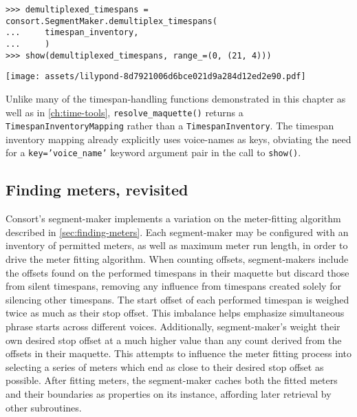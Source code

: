 \begin{abjadbookoutput}
\begin{singlespacing}
\vspace{-0.5\baselineskip}
\begin{lstlisting}
>>> demultiplexed_timespans = consort.SegmentMaker.demultiplex_timespans(
...     timespan_inventory,
...     )
>>> show(demultiplexed_timespans, range_=(0, (21, 4)))
\end{lstlisting}
\noindent\texttt{[image: assets/lilypond-8d7921006d6bce021d9a284d12ed2e90.pdf]}
\end{singlespacing}
\end{abjadbookoutput}

\noindent Unlike many of the timespan-handling functions demonstrated in this
chapter as well as in \autoref{ch:time-tools}, \texttt{resolve\_maquette()}
returns a \texttt{TimespanInventoryMapping} rather than a
\texttt{TimespanInventory}. The timespan inventory mapping already
explicitly uses voice-names as keys, obviating the need for a
\texttt{key='voice\_name'} keyword argument pair in the call to
\texttt{show()}.

\subsection{Finding meters, revisited}
\label{ssec:finding-meters-revisited}

Consort's segment-maker implements a variation on the meter-fitting algorithm
described in \autoref{sec:finding-meters}. Each segment-maker may be configured
with an inventory of permitted meters, as well as maximum meter run length, in
order to drive the meter fitting algorithm. When counting offsets,
segment-makers include the offsets found on the performed timespans in their
maquette but discard those from silent timespans, removing any influence from
timespans created solely for silencing other timespans. The start offset of
each performed timespan is weighed twice as much as their stop offset. This
imbalance helps emphasize simultaneous phrase starts across different voices.
Additionally, segment-maker's weight their own desired stop offset at a much
higher value than any count derived from the offsets in their maquette. This
attempts to influence the meter fitting process into selecting a series of
meters which end as close to their desired stop offset as possible. After
fitting meters, the segment-maker caches both the fitted meters and their
boundaries as properties on its instance, affording later retrieval by other
subroutines.

